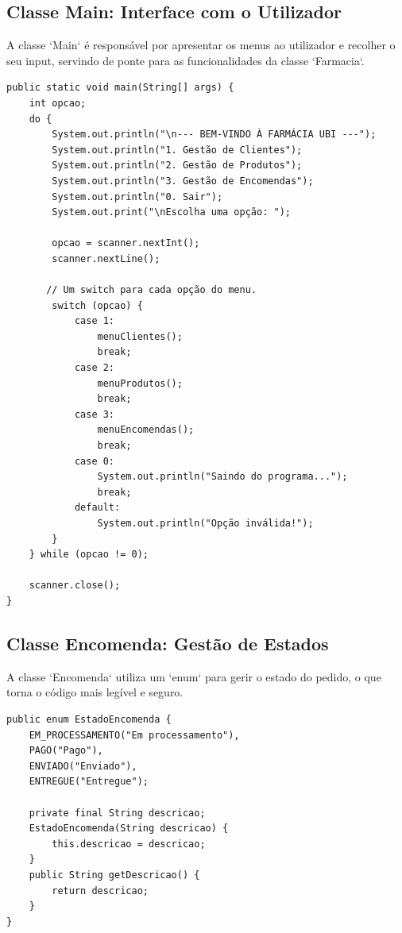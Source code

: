 \documentclass[a4paper,12pt]{article}
\begin{document}
\subsection{Classe Main: Interface com o Utilizador}
A classe `Main` é responsável por apresentar os menus ao utilizador e recolher o seu input, servindo de ponte para as funcionalidades da classe `Farmacia`.

\begin{minipage}{\linewidth}
\begin{lstlisting}[caption={Menu principal em Main.java}]
public static void main(String[] args) {
    int opcao;
    do {
        System.out.println("\n--- BEM-VINDO À FARMÁCIA UBI ---");
        System.out.println("1. Gestão de Clientes");
        System.out.println("2. Gestão de Produtos");
        System.out.println("3. Gestão de Encomendas");
        System.out.println("0. Sair");
        System.out.print("\nEscolha uma opção: ");

        opcao = scanner.nextInt();
        scanner.nextLine();

       // Um switch para cada opção do menu.
        switch (opcao) {
            case 1:
                menuClientes();
                break;
            case 2:
                menuProdutos();
                break;
            case 3:
                menuEncomendas();
                break;
            case 0:
                System.out.println("Saindo do programa...");
                break;
            default:
                System.out.println("Opção inválida!");
        }
    } while (opcao != 0);

    scanner.close();
}
\end{lstlisting}
\end{minipage}

\subsection{Classe Encomenda: Gestão de Estados}
A classe `Encomenda` utiliza um `enum` para gerir o estado do pedido, o que torna o código mais legível e seguro.

\begin{minipage}{\linewidth}
\begin{lstlisting}[caption={Enum EstadoEncomenda em Encomenda.java}]
public enum EstadoEncomenda {
    EM_PROCESSAMENTO("Em processamento"),
    PAGO("Pago"),
    ENVIADO("Enviado"),
    ENTREGUE("Entregue");

    private final String descricao;
    EstadoEncomenda(String descricao) {
        this.descricao = descricao;
    }
    public String getDescricao() {
        return descricao;
    }
}
\end{lstlisting}
\end{minipage}
\end{document}
